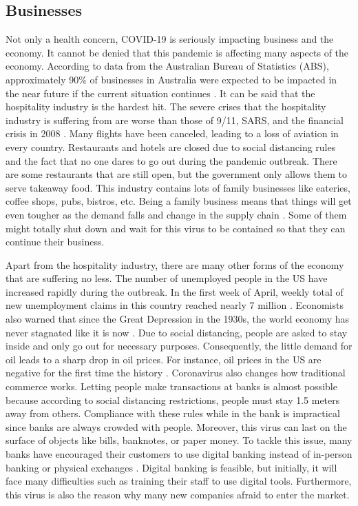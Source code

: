   \subsection{Businesses}
    \par Not only a health concern, COVID-19 is seriously impacting business and the economy. It cannot be denied that this pandemic is affecting many aspects of the economy. According to data from the Australian Bureau of Statistics (ABS), approximately 90\% of businesses in Australia were expected to be impacted in the near future if the current situation continues \parencite{Stake2-1}. It can be said that the hospitality industry is the hardest hit. The severe crises that the hospitality industry is suffering from are worse than those of 9/11, SARS, and the financial crisis in 2008 \parencite{Stake2-2}. Many flights have been canceled, leading to a loss of aviation in every country. Restaurants and hotels are closed due to social distancing rules and the fact that no one dares to go out during the pandemic outbreak. There are some restaurants that are still open, but the government only allows them to serve takeaway food. This industry contains lots of family businesses like eateries, coffee shops, pubs, bistros, etc. Being a family business means that things will get even tougher as the demand falls and change in the supply chain \parencite{Stake2-2}. Some of them might totally shut down and wait for this virus to be contained so that they can continue their business.
    \par Apart from the hospitality industry, there are many other forms of the economy that are suffering no less. The number of unemployed people in the US have increased rapidly during the outbreak. In the first week of April, weekly total of new unemployment claims in this country reached nearly 7 million \parencite{Stake2-3}. Economists also warned that since the Great Depression in the 1930s, the world economy has never stagnated like it is now \parencite{Stake2-4}. Due to social distancing, people are asked to stay inside and only go out for necessary purposes. Consequently, the little demand for oil leads to a sharp drop in oil prices. For instance, oil prices in the US are negative for the first time the history \parencite{Stake2-3}. Coronavirus also changes how traditional commerce works. Letting people make transactions at banks is almost possible because according to social distancing restrictions, people must stay 1.5 meters away from others. Compliance with these rules while in the bank is impractical since banks are always crowded with people. Moreover, this virus can last on the surface of objects like bills, banknotes, or paper money. To tackle this issue, many banks have encouraged their customers to use digital banking instead of in-person banking or physical exchanges \parencite{Stake2-5}. Digital banking is feasible, but initially, it will face many difficulties such as training their staff to use digital tools. Furthermore, this virus is also the reason why many new companies afraid to enter the market.
